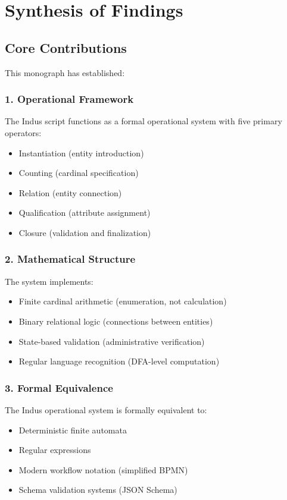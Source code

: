 \section{Synthesis of Findings}

\subsection{Core Contributions}

This monograph has established:

\subsubsection{1. Operational Framework}
The Indus script functions as a formal operational system with five primary operators:
\begin{itemize}
    \item Instantiation (entity introduction)
    \item Counting (cardinal specification)
    \item Relation (entity connection)
    \item Qualification (attribute assignment)
    \item Closure (validation and finalization)
\end{itemize}

\subsubsection{2. Mathematical Structure}
The system implements:
\begin{itemize}
    \item Finite cardinal arithmetic (enumeration, not calculation)
    \item Binary relational logic (connections between entities)
    \item State-based validation (administrative verification)
    \item Regular language recognition (DFA-level computation)
\end{itemize}

\subsubsection{3. Formal Equivalence}
The Indus operational system is formally equivalent to:
\begin{itemize}
    \item Deterministic finite automata
    \item Regular expressions
    \item Modern workflow notation (simplified BPMN)
    \item Schema validation systems (JSON Schema)
\end{itemize}

